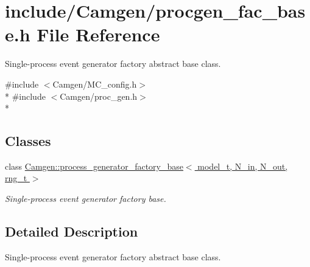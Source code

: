 \hypertarget{a00734}{}\section{include/\+Camgen/procgen\+\_\+fac\+\_\+base.h File Reference}
\label{a00734}


Single-\/process event generator factory abstract base class.  


{\ttfamily \#include $<$Camgen/\+M\+C\+\_\+config.\+h$>$}\\*
{\ttfamily \#include $<$Camgen/proc\+\_\+gen.\+h$>$}\\*
\subsection*{Classes}
\begin{DoxyCompactItemize}
\item 
class \hyperlink{a00438}{Camgen\+::process\+\_\+generator\+\_\+factory\+\_\+base$<$ model\+\_\+t, N\+\_\+in, N\+\_\+out, rng\+\_\+t $>$}
\begin{DoxyCompactList}\small\item\em Single-\/process event generator factory base. \end{DoxyCompactList}\end{DoxyCompactItemize}


\subsection{Detailed Description}
Single-\/process event generator factory abstract base class. 

